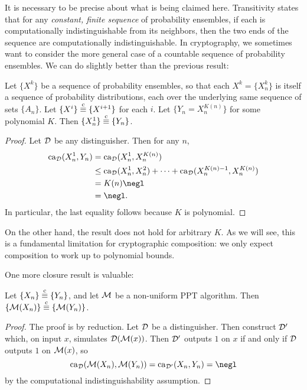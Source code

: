 It is necessary to be precise about what is being claimed here. Transitivity
states that for any \emph{constant, finite sequence} of probability ensembles,
if each is computationally indistinguishable from its neighbors, then the two
ends of the sequence are computationally indistinguishable. In cryptography, we
sometimes want to consider the more general case of a countable sequence of
probability ensembles. We can do slightly better than the previous result:

\begin{prop}\label{thm:polynomial-indistinguishability}
  Let $\{X^k\}$ be a sequence of probability ensembles, so
  that each $X^k = \{X^k_n\}$ is itself a sequence of probability distributions,
  each over the underlying same sequence of sets $\{A_n\}$. Let
  $\{X^i\}\overset{\text{c}}{\equiv}\{X^{i+1}\}$ for each $i$. Let $\{Y_n = X^{K(n)}_n\}$ for some
  polynomial $K$. Then $\{X^1_n\}\overset{\text{c}}{\equiv}\{Y_n\}$.
\end{prop}

\begin{proof}
  Let $\mathcal{D}$ be any distinguisher. Then for any $n$, \begin{align*}
    \ca_\cD(X^1_n, Y_n) &= \ca_\cD(X^1_n, X^{K(n)}_n) \\
                          &\leq \ca_\cD(X^1_n, X^2_n) + \cdots + \ca_\cD(X^{K(n) - 1}_n, X^{K(n)}_n) \\
                          &= K(n)\negl \\
                          &= \negl.
   \end{align*}
   In particular, the last equality follows because $K$ is polynomial.
\end{proof}

On the other hand, the result does not hold for arbitrary $K$. As we will see,
this is a fundamental limitation for cryptographic composition: we only expect
composition to work up to polynomial bounds.

One more closure result is valuable:

\begin{prop}\label{thm:ci-composition}
  Let $\{X_n\}\overset{\text{c}}{\equiv}\{Y_n\}$, and let $\mathcal{M}$ be a non-uniform PPT algorithm. Then
  $\{\mathcal{M}(X_n)\} \overset{\text{c}}{\equiv} \{\mathcal{M}(Y_n)\}$.
\end{prop}

\begin{proof}
  The proof is by reduction. Let $\mathcal{D}$ be a distinguisher. Then construct $\mathcal{D}'$
  which, on input $x$, simulates $\mathcal{D}(\mathcal{M}(x))$. Then $\mathcal{D}'$ outputs $1$ on $x$ if and
  only if $\mathcal{D}$ outputs $1$ on $\mathcal{M}(x)$, so \[
    \ca_\cD(\cM(X_n), \cM(Y_n)) = \ca_{\cD'}(X_n, Y_n) = \negl
  \] by the computational indistinguishability assumption.
\end{proof}

